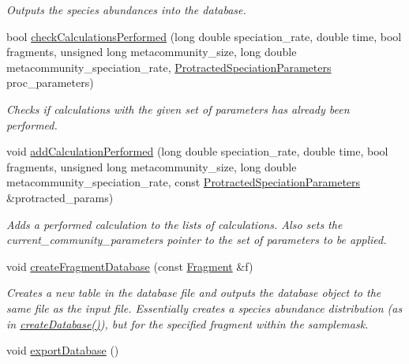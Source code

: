 \begin{DoxyCompactItemize}
\begin{DoxyCompactList}\small\item\em Outputs the species abundances into the database. \end{DoxyCompactList}\item 
bool \hyperlink{class_community_a8f2a0b27685c335606ba3971c4438fab}{check\+Calculations\+Performed} (long double speciation\+\_\+rate, double time, bool fragments, unsigned long metacommunity\+\_\+size, long double metacommunity\+\_\+speciation\+\_\+rate, \hyperlink{struct_protracted_speciation_parameters}{Protracted\+Speciation\+Parameters} proc\+\_\+parameters)
\begin{DoxyCompactList}\small\item\em Checks if calculations with the given set of parameters has already been performed. \end{DoxyCompactList}\item 
void \hyperlink{class_community_a118e3a4f337468b21a420f993e9983e1}{add\+Calculation\+Performed} (long double speciation\+\_\+rate, double time, bool fragments, unsigned long metacommunity\+\_\+size, long double metacommunity\+\_\+speciation\+\_\+rate, const \hyperlink{struct_protracted_speciation_parameters}{Protracted\+Speciation\+Parameters} \&protracted\+\_\+params)
\begin{DoxyCompactList}\small\item\em Adds a performed calculation to the lists of calculations. Also sets the current\+\_\+community\+\_\+parameters pointer to the set of parameters to be applied. \end{DoxyCompactList}\item 
void \hyperlink{class_community_ad6515ff43ea8189a1acdcccfe893bbba}{create\+Fragment\+Database} (const \hyperlink{struct_fragment}{Fragment} \&f)
\begin{DoxyCompactList}\small\item\em Creates a new table in the database file and outputs the database object to the same file as the input file. Essentially creates a species abundance distribution (as in \hyperlink{class_community_ad6e92dafaf00fd65cc29ca436dc61a2e}{create\+Database()}), but for the specified fragment within the samplemask. \end{DoxyCompactList}\item 
void \hyperlink{class_community_a280850bd6077692755cc419028aa5d67}{export\+Database} ()\hypertarget{class_community_a280850bd6077692755cc419028aa5d67}{}\label{class_community_a280850bd6077692755cc419028aa5d67}


\end{DoxyCompactItemize}
